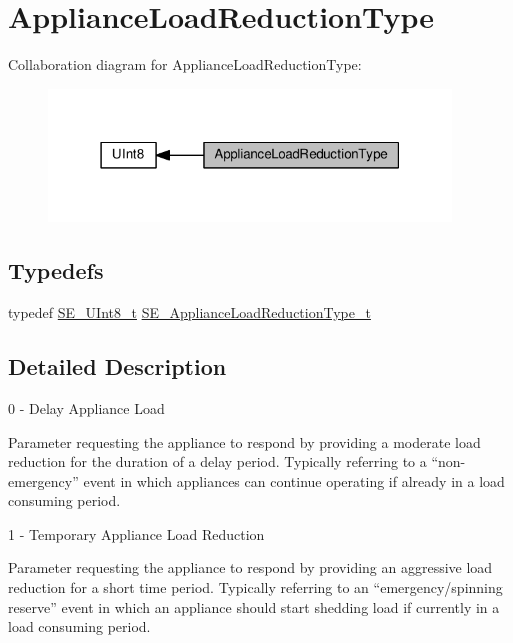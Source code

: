 \hypertarget{group__ApplianceLoadReductionType}{}\section{Appliance\+Load\+Reduction\+Type}
\label{group__ApplianceLoadReductionType}
Collaboration diagram for Appliance\+Load\+Reduction\+Type\+:\nopagebreak
\begin{figure}[H]
\begin{center}
\leavevmode
\includegraphics[width=303pt]{group__ApplianceLoadReductionType}
\end{center}
\end{figure}
\subsection*{Typedefs}
\begin{DoxyCompactItemize}
\item 
typedef \hyperlink{group__UInt8_gaf7c365a1acfe204e3a67c16ed44572f5}{S\+E\+\_\+\+U\+Int8\+\_\+t} \hyperlink{group__ApplianceLoadReductionType_ga05e14b2c51c55d623a23c75b2ccae048}{S\+E\+\_\+\+Appliance\+Load\+Reduction\+Type\+\_\+t}
\end{DoxyCompactItemize}


\subsection{Detailed Description}
0 -\/ Delay Appliance Load

Parameter requesting the appliance to respond by providing a moderate load reduction for the duration of a delay period. Typically referring to a “non-\/emergency” event in which appliances can continue operating if already in a load consuming period.

1 -\/ Temporary Appliance Load Reduction

Parameter requesting the appliance to respond by providing an aggressive load reduction for a short time period. Typically referring to an “emergency/spinning reserve” event in which an appliance should start shedding load if currently in a load consuming period.

